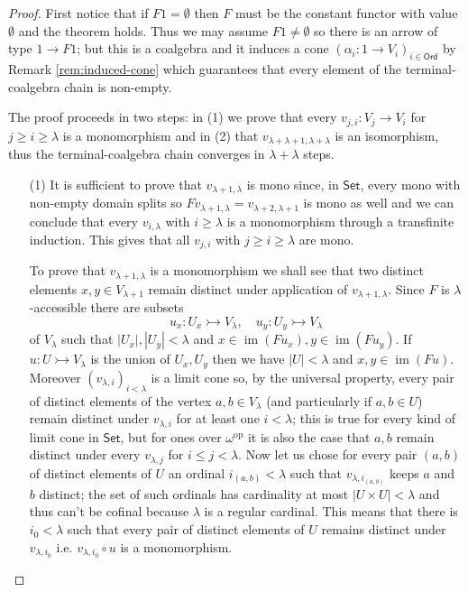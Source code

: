 \documentclass[letterpaper, 11pt, oneside]{memoir}
\theoremstyle{myteo}
\numberwithin{equation}{section}
\newcommand{\Ord}{\textsf{Ord}}
\newcommand{\Set}{\textsf{Set}}
\newcommand{\op}{\text{op}}
\DeclareMathOperator{\im}{im}
\begin{document}
\begin{proof}
  First notice that if \(F1 = \emptyset\) then \(F\) must be the constant functor with value \(\emptyset\) and the theorem holds.
  Thus we may assume \(F1 \neq \emptyset\) so there is an arrow of type \(1 \to F1\); but this is a coalgebra and it induces a cone \((\alpha_i:1 \to V_i)_{i \in \Ord}\) by Remark \ref{rem:induced-cone} which guarantees that every element of the terminal-coalgebra chain is non-empty.

  The proof proceeds in two steps: in (1) we prove that every \(v_{j,i}:V_j \to V_i\) for \(j \geq i \geq \lambda\) is a monomorphism and in (2) that \(v_{\lambda+\lambda + 1, \lambda + \lambda}\) is an isomorphism, thus the terminal-coalgebra chain converges in \(\lambda+\lambda\) steps.
  \begin{itemize}
  \item[(1)]
    It is sufficient to prove that \(v_{\lambda + 1, \lambda}\) is mono since, in \(\Set\), every mono with non-empty domain splits so \(Fv_{\lambda+1, \lambda} = v_{\lambda + 2, \lambda +1}\) is mono as well and we can conclude that every \(v_{i, \lambda}\) with \(i \geq \lambda\) is a monomorphism through a transfinite induction.
    This gives that all \(v_{j, i}\) with \(j \geq i \geq \lambda\) are mono.
    
    To prove that \(v_{\lambda+1, \lambda}\) is a monomorphism we shall see that two distinct elements \(x, y \in V_{\lambda + 1}\) remain distinct under application of \(v_{\lambda+1, \lambda}\).
    Since \(F\) is \(\lambda\)-accessible there are subsets
    \begin{equation*}
      u_x : U_x \rightarrowtail V_\lambda,\quad  u_y : U_y \rightarrowtail V_\lambda
    \end{equation*}
    of \(V_\lambda\) such that \(|U_x|, |U_y| < \lambda\) and \(x \in \im (Fu_x), y \in \im (Fu_y)\).
    If \(u : U \rightarrowtail V_\lambda\) is the union of \(U_x, U_y\) then we have \(|U| < \lambda\) and \(x, y \in \im (Fu)\).
    Moreover \((v_{\lambda, i})_{i < \lambda}\) is a limit cone so, by the universal property, every pair of distinct elements of the vertex \(a,b \in V_\lambda\) (and particularly if \(a,b \in U\)) remain distinct under \(v_{\lambda, i}\) for at least one \(i < \lambda\); this is true for every kind of limit cone in \(\Set\), but for ones over \(\omega^\op\) it is also the case that \(a, b\) remain distinct under every \(v_{\lambda, j}\) for \(i \leq j < \lambda\). Now let us chose for every pair \((a, b)\) of distinct elements of \(U\) an ordinal \(i_{(a, b)} < \lambda\) such that \(v_{\lambda, i_{(a, b)}}\) keeps \(a\) and \(b\) distinct; the set of such ordinals has cardinality at most \(|U \times U| < \lambda\) and thus can't be cofinal because \(\lambda\) is a regular cardinal. This means that there is \(i_0 < \lambda\) such that every pair of distinct elements of \(U\) remains distinct under \(v_{\lambda, i_0}\) i.e. \(v_{\lambda, i_0} \circ u\) is a monomorphism.


\end{itemize}
\end{proof}
\end{document}
